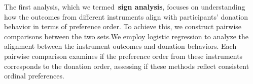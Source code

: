 The first analysis, which we termed~\textbf{sign analysis}, focuses on understanding how the outcomes from different instruments align with participants' donation behavior in terms of preference order. To achieve this, we construct pairwise comparisons between the two sets.We employ logistic regression to analyze the alignment between the instrument outcomes and donation behaviors. Each pairwise comparison examines if the preference order from these instruments corresponds to the donation order, assessing if these methods reflect consistent ordinal preferences.

